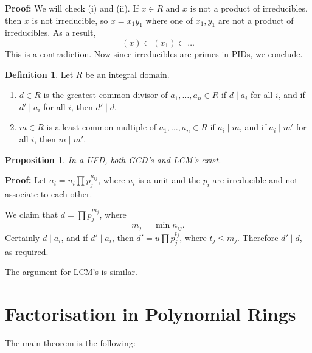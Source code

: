\documentclass[12pt]{article}
\newtheorem{proposition}{Proposition}[section]
\theoremstyle{definition}
\newtheorem{definition}{Definition}[section]
\theoremstyle{remark}
\begin{document}
\begin{adjustbox}{minipage = \columnwidth - 25.5pt, margin=1em, frame=1pt, margin=0em}
	\textbf{Proof:} We will check (i) and (ii). If $x \in R$ and $x$ is not a product of irreducibles, then $x$ is not irreducible, so $x = x_1 y_1$ where one of $x_1, y_1$ are not a product of irreducibles. As a result,
	\[
		(x) \subset (x_1) \subset \ldots
	\]	
	This is a contradiction. Now since irreducibles are primes in PIDs, we conclude.
\end{adjustbox}

\begin{definition}
	Let $R$ be an integral domain.
	\begin{enumerate}[label = (\roman*)]
		\item $d \in R$ is the greatest common divisor of $a_1, \ldots, a_n \in R$ if $d \mid a_i$ for all $i$, and if $d' \mid a_i$ for all $i$, then $d' \mid d$.
		\item $m \in R$ is a least common multiple of $a_1, \ldots, a_n \in R$ if $a_i \mid m$, and if $a_i \mid m'$ for all $i$, then $m \mid m'$.
	\end{enumerate}
	
\end{definition}

\begin{proposition}
	In a UFD, both GCD's and LCM's exist.
\end{proposition}

\begin{adjustbox}{minipage = \columnwidth - 25.5pt, margin=1em, frame=1pt, margin=0em}
\textbf{Proof:} Let $a_i = u_i \prod p_j^{n_{ij}}$, where $u_i$ is a unit and the $p_i$ are irreducible and not associate to each other.

We claim that $d = \prod p_j^{m_j}$, where
\[
	m_j = \min n_{ij}
.\]
Certainly $d \mid a_i$, and if $d' \mid a_i$, then $d' = u \prod p_j^{t_j}$, where $t_j \leq m_j$. Therefore $d' \mid d$, as required.

The argument for LCM's is similar.
\end{adjustbox}


\newpage

\section{Factorisation in Polynomial Rings}%
\label{sec:factorisation_in_polynomial_rings}

The main theorem is the following:
\end{document}
